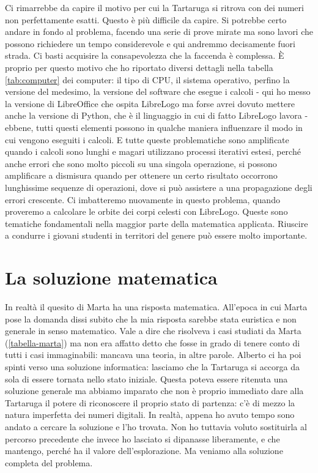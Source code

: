 Ci rimarrebbe da capire il motivo per cui la Tartaruga si ritrova con dei
numeri non perfettamente esatti. Questo è più difficile da capire. Si potrebbe
certo andare in fondo al problema, facendo una serie di prove mirate ma sono
lavori che possono richiedere un tempo considerevole e qui andremmo decisamente
fuori strada. Ci basti acquisire la consapevolezza che la faccenda è complessa. È proprio per questo
motivo che ho riportato diversi dettagli nella tabella \ref{tab:computer} dei
computer: il tipo di CPU, il sistema operativo, perfino la versione del
medesimo, la versione del software che esegue i calcoli - qui ho messo la
versione di LibreOffice che ospita LibreLogo ma forse avrei dovuto mettere
anche la versione di Python, che è il linguaggio in cui di fatto LibreLogo lavora
- ebbene, tutti questi elementi possono in qualche maniera influenzare il modo
in cui vengono eseguiti i calcoli. E tutte queste problematiche sono
amplificate quando i calcoli sono lunghi e magari utilizzano processi iterativi
estesi, perché anche errori che sono molto piccoli su una singola operazione,
si possono amplificare a dismisura quando per ottenere un certo risultato
occorrono lunghissime sequenze di operazioni, dove si può assistere a una
propagazione degli errori crescente. Ci imbatteremo nuovamente in questo
problema, quando proveremo a calcolare le orbite dei corpi celesti con
LibreLogo. Queste sono tematiche fondamentali nella maggior parte della
matematica applicata. Riuscire a condurre i giovani studenti in territori del
genere può essere molto importante.


\section {La soluzione matematica}
\label{sez:soluzione-matematica}

In realtà il quesito di Marta ha una risposta matematica. All'epoca in cui
Marta pose la domanda dissi subito che la mia risposta sarebbe stata euristica e non
generale in senso matematico. Vale a dire che risolveva i casi studiati da
Marta (\ref{tabella-marta}) ma non era affatto detto che fosse in grado di tenere conto
di tutti i casi immaginabili: mancava una teoria, in altre parole. Alberto ci ha
poi spinti verso una soluzione informatica: lasciamo che la Tartaruga si
accorga da sola di essere tornata nello stato iniziale. Questa poteva essere
ritenuta una soluzione generale ma abbiamo imparato che non è proprio immediato
dare alla Tartaruga il potere di riconoscere il proprio stato di partenza: c'è
di mezzo la natura imperfetta dei numeri digitali. In realtà, appena ho avuto tempo sono
andato a cercare la soluzione e l'ho trovata. Non ho tuttavia voluto
sostituirla al percorso precedente che invece ho lasciato si dipanasse liberamente, e che
mantengo, perché ha il valore dell'esplorazione. Ma veniamo alla soluzione
completa del problema.

